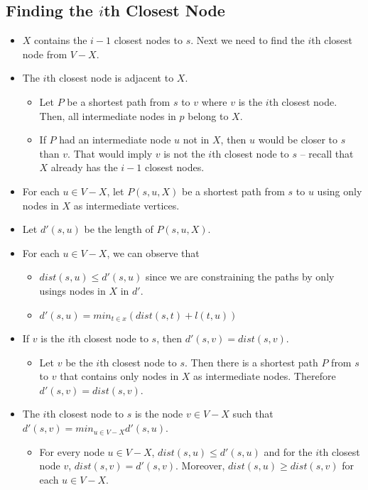 \documentclass[12pt]{article}
\begin{document}
\subsection{Finding the $i$th Closest Node}
\begin{itemize}
    \item $X$ contains the $i - 1$ closest nodes to $s$. Next we need to find the $i$th closest node from $V - X$.
    \item The $i$th closest node is adjacent to $X$.
    \begin{itemize}
        \item Let $P$ be a shortest path from $s$ to $v$ where $v$ is the $i$th closest node. Then, all intermediate nodes in $p$ belong to $X$.
        \item If $P$ had an intermediate node $u$ not in $X$, then $u$ would be closer to $s$ than $v$. That would imply $v$ is not the $i$th closest node to $s$ -- recall that $X$ already has the $i - 1$ closest nodes.
    \end{itemize}
    \item For each $u \in V - X$, let $P(s, u, X)$ be a shortest path from $s$ to $u$ using only nodes in $X$ as intermediate vertices.
    \item Let $d'(s, u)$ be the length of $P(s, u, X)$.
    \item For each $u \in V - X$, we can observe that
    \begin{itemize}
        \item $dist(s, u) \leq d'(s, u)$ since we are constraining the paths by only usings nodes in $X$ in $d'$.
        \item $d'(s, u) = min_{t \in x}(dist(s, t) + l(t, u))$
    \end{itemize}
    \item If $v$ is the $i$th closest node to $s$, then $d'(s, v) = dist(s, v)$.
    \begin{itemize}
        \item Let $v$ be the $i$th closest node to $s$. Then there is a shortest path $P$ from $s$ to $v$ that contains only nodes in $X$ as intermediate nodes. Therefore $d'(s, v) = dist(s, v)$.
    \end{itemize}
    \item The $i$th closest node to $s$ is the node $v \in V - X$ such that $d'(s, v) = min_{u \in V - X}d'(s, u)$.
    \begin{itemize}
        \item For every node $u \in V - X$, $dist(s, u) \leq d'(s, u)$ and for the $i$th closest node $v$, $dist(s, v) = d'(s, v)$. Moreover, $dist(s, u) \geq dist(s, v)$ for each $u \in V - X$.

\end{itemize}
\end{itemize}
\end{document}
